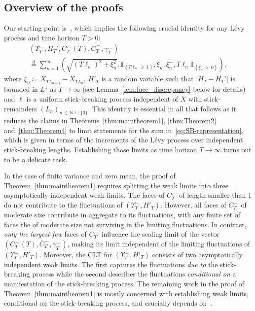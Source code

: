 \documentclass[10pt]{amsart}
\theoremstyle{definition}\newtheorem{defi}[theo]{Definition}\newtheorem{rema}[theo]{Remark}\newtheorem{exam}[theo]{Example}\newtheorem{exem}[theo]{Example}\newtheorem{nota}[theo]{Notation}
\newcommand\N{\mathbb{N}}
\newcommand\1{\mathds{1}}
\newcommand\eqd{\overset{d}{=}}
\newcommand\ov[1]{\overline{#1}}
\begin{document}
\subsection{Overview of the proofs}\label{sec:roadmap}

Our starting point is~\cite[Theorem~11]{CM_Fluctuation_Levy}, which implies the following crucial identity for any Lévy process and time horizon $T>0$:
\begin{equation}\label{eq:SB-representation}
\begin{multlined}
\left(\Upsilon_T^\frown, H_T', C_T^\frown(T),
\ov{C}_T^\frown,
\gamma_T^\frown\right)\\
\eqd \sum_{n=1}^\infty
\left(\sqrt{(T\ell_n)^2+\xi_n^2},
\1_{\left\{T\ell_n\,\ge\,1\right\}},
\xi_n,
\xi_n^+, T\ell_n\1_{\left\{\xi_n\,>\,0\right\}}\right),
\end{multlined}
\end{equation}
where $\xi_n\coloneqq X_{TL_{n-1}}-X_{TL_n}$, $H'_T$ is a random variable such that $|H_T-H_T'|$ is bounded in $L^1$ as $T\to\infty$ (see Lemma~\ref{lem:face_discrepancy} below for details) and $\ell$ is a uniform stick-breaking process independent of $X$ with stick-remainders $(L_n)_{n\,\in\,\N\,\cup\,\{0\}}$. This identity is essential in all that follows as it reduces the claims in Theorems~\ref{thm:maintheorem1}, \ref{thm:Theorem2} and~\ref{thm:Theorem4} to limit statements for the sum in~\eqref{eq:SB-representation}, which is given in terms of the increments of the Lévy process over independent stick-breaking lengths. Establishing those limits as time horizon $T\to\infty$ turns out to be a delicate task.

In the case of finite variance and zero mean, the proof of Theorem~\ref{thm:maintheorem1} requires splitting the weak limits into three asymptotically independent weak limits. The faces of $C_T^\frown$ of length smaller than $1$ do not contribute to the fluctuations of $(\Upsilon_T^\frown,H'_T)$. However, all faces of $C_T^\frown$ of moderate size contribute in aggregate to its fluctuations, with any finite set of faces the of moderate size not surviving in the limiting fluctuations. In contrast, \emph{only the largest few} faces of $C_T^\frown$ influence the scaling limit of the vector $(C_T^\frown(T),\ov C_T^\frown,\gamma_T^\frown)$, making its limit independent of the limiting fluctuations of $(\Upsilon_T^\frown,H'_T)$. Moreover, the CLT for $(\Upsilon_T^\frown,H'_T)$ consists of two asymptotically independent weak limits. The first captures the fluctuations \emph{due to} the stick-breaking process while the second describes the fluctuations \emph{conditional on} a manifestation of the stick-breaking process. The remaining work in the proof of Theorem~\ref{thm:maintheorem1} is mostly concerned with establishing weak limits, conditional on the stick-breaking process, and crucially depends on~\cite[Theorem~1.1]{MR4285923}.
\end{document}
